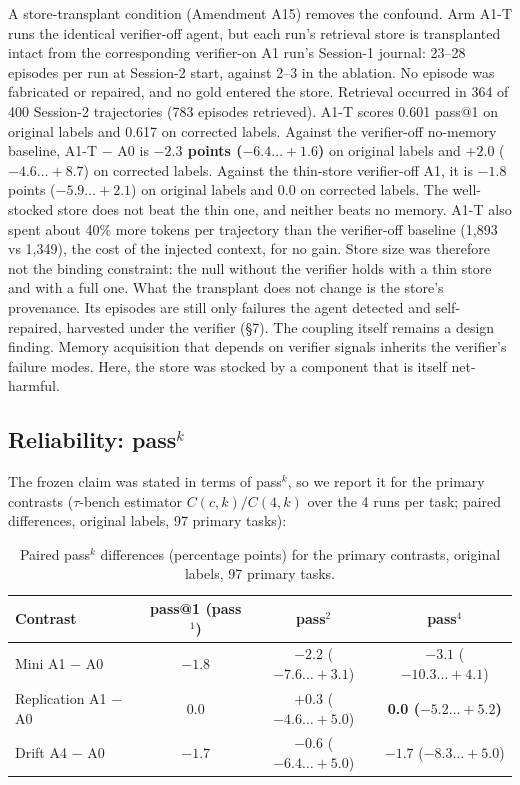 \documentclass[sigconf, nonacm]{acmart}
\begin{document}
A store-transplant condition (Amendment A15) removes the confound. Arm A1-T runs the identical verifier-off agent, but each run's retrieval store is transplanted intact from the corresponding verifier-on A1 run's Session-1 journal: 23--28 episodes per run at Session-2 start, against 2--3 in the ablation. No episode was fabricated or repaired, and no gold entered the store. Retrieval occurred in 364 of 400 Session-2 trajectories (783 episodes retrieved). A1-T scores 0.601 pass@1 on original labels and 0.617 on corrected labels. Against the verifier-off no-memory baseline, A1-T $-$ A0 is \textbf{$-2.3$ points ($-6.4\ldots+1.6$)} on original labels and $+2.0$ ($-4.6\ldots+8.7$) on corrected labels. Against the thin-store verifier-off A1, it is $-1.8$ points ($-5.9\ldots+2.1$) on original labels and 0.0 on corrected labels. The well-stocked store does not beat the thin one, and neither beats no memory. A1-T also spent about 40\% more tokens per trajectory than the verifier-off baseline (1,893 vs 1,349), the cost of the injected context, for no gain. Store size was therefore not the binding constraint: the null without the verifier holds with a thin store and with a full one. What the transplant does not change is the store's provenance. Its episodes are still only failures the agent detected and self-repaired, harvested under the verifier (\S7). The coupling itself remains a design finding. Memory acquisition that depends on verifier signals inherits the verifier's failure modes. Here, the store was stocked by a component that is itself net-harmful.

\subsection{Reliability: pass$^k$}

The frozen claim was stated in terms of pass$^k$, so we report it for the primary contrasts ($\tau$-bench estimator $C(c,k)/C(4,k)$ over the 4 runs per task; paired differences, original labels, 97 primary tasks):

\begin{table}[t]
  \caption{Paired pass$^k$ differences (percentage points) for the primary contrasts, original labels, 97 primary tasks.}
  \label{tab:passk}
  \centering
  \begin{tabular}{lccc}
    \toprule
    Contrast & pass@1 (pass$^1$) & pass$^2$ & pass$^4$\\
    \midrule
    Mini A1 $-$ A0 & $-1.8$ & $-2.2$ ($-7.6\ldots+3.1$) & $-3.1$ ($-10.3\ldots+4.1$)\\
    Replication A1 $-$ A0 & 0.0 & $+0.3$ ($-4.6\ldots+5.0$) & \textbf{0.0 ($-5.2\ldots+5.2$)}\\
    Drift A4 $-$ A0 & $-1.7$ & $-0.6$ ($-6.4\ldots+5.0$) & $-1.7$ ($-8.3\ldots+5.0$)\\
    \bottomrule
  \end{tabular}
\end{table}
\end{document}
